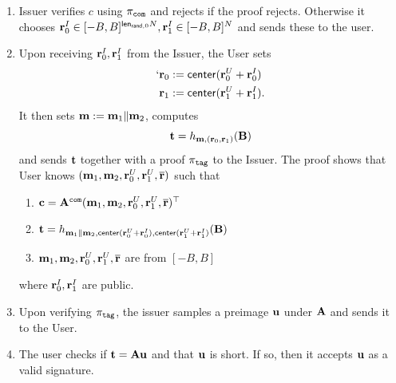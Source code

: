 \begin{description}
\begin{enumerate}
    \item Issuer verifies $c$ using $\pi_{\mathtt{com}}$ and rejects if the proof rejects. Otherwise it chooses $\mathbf{r}_{0}^I\in [-B,B]^{\mathsf{len}_{\mathsf{rand},0}N},\mathbf{r}_{1}^I\in [-B,B]^N$ and sends these to the user.
    \item Upon receiving $\mathbf{r}_{0}^I,\mathbf{r}_{1}^I$ from the Issuer, the User sets \begin{align*}`\mathbf{r}_0&:=\mathsf{center}(\mathbf{r}_{0}^U+\mathbf{r}_{0}^I)\\
    \mathbf{r}_1&:=\mathsf{center}(\mathbf{r}_{1}^U+\mathbf{r}_{1}^I)\text{.}
    \end{align*}
        It then sets $\mathbf{m}:=\mathbf{m}_1\|\mathbf{m}_2$, computes $$ \mathbf{t}=h_{\mathbf{m},(\mathbf{r}_0,\mathbf{r}_1)}(\mathbf{B}) $$
        and sends $\mathbf{t}$ together with a proof $\pi_{\mathtt{tag}}$ to the Issuer. The proof shows that User knows $(\mathbf{m}_1,\mathbf{m}_2, \mathbf{r}_{0}^U,\mathbf{r}_{1}^U,\overline{\mathbf{r}})$  such that 
        \begin{enumerate}
            \item  $\mathbf{c} = \mathbf{A}^{\mathtt{com}}(\mathbf{m}_1,\mathbf{m}_2, \mathbf{r}_{0}^U,\mathbf{r}_{1}^U,\overline{\mathbf{r}})^\top$
            \item $\mathbf{t}=h_{\mathbf{m}_1\|\mathbf{m}_2,\mathsf{center}(\mathbf{r}_{0}^U+\mathbf{r}_{0}^I),\mathsf{center}(\mathbf{r}_{1}^U+\mathbf{r}_{1}^I)}(\mathbf{B})$
            \item $\mathbf{m}_1,\mathbf{m}_2, \mathbf{r}_{0}^U,\mathbf{r}_{1}^U,\overline{\mathbf{r}}$ are from $[-B,B]$
        \end{enumerate}
  where $\mathbf{r}_{0}^I,\mathbf{r}_{1}^I$ are public.
        \item Upon verifying $\pi_{\mathtt{tag}}$, the issuer samples a preimage $\mathbf{u}$ under $\mathbf{A}$ and sends it to the User.
        \item The user checks if $\mathbf{t}=\mathbf{A}\mathbf{u}$ and that $\mathbf{u}$ is short. If so, then it accepts $\mathbf{u}$ as a valid signature.
    \end{enumerate}



\end{description}
